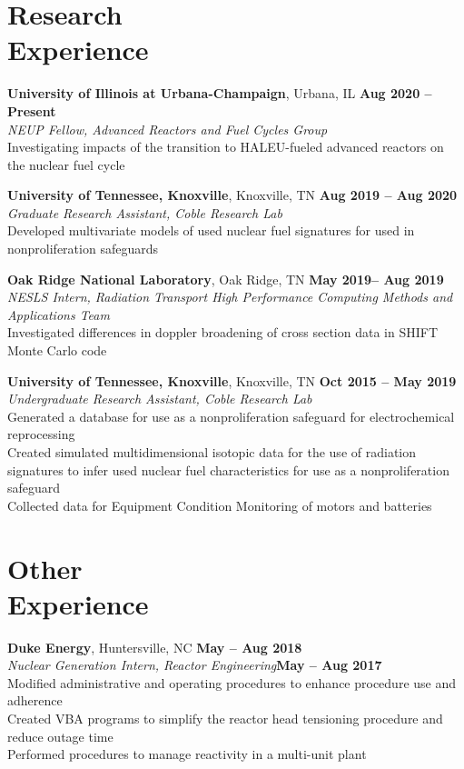 \documentclass[margin,line]{resume}
\begin{document}
\begin{resume}
    \section{\mysidestyle Research\\Experience}
    \textbf{University of Illinois at Urbana-Champaign}, Urbana, IL \hfill \textbf{Aug 2020 -- Present} \\
                \textsl{NEUP Fellow, Advanced Reactors and Fuel Cycles Group} \\
                Investigating impacts of the transition to HALEU-fueled advanced 
                reactors on the nuclear fuel cycle

    \textbf{University of Tennessee, Knoxville}, Knoxville, TN \hfill \textbf{Aug 2019 -- Aug 2020}\\
                \textsl{Graduate Research Assistant, Coble Research Lab} \\ 
                Developed multivariate models of used nuclear fuel signatures for 
                used in nonproliferation safeguards

    \textbf{Oak Ridge National Laboratory}, Oak Ridge, TN \hfill \textbf{May 2019-- Aug 2019}\\
                \textsl{NESLS Intern, Radiation Transport High Performance Computing Methods and Applications Team}\\
                Investigated differences in doppler broadening of cross section data in SHIFT Monte Carlo code

    \textbf{University of Tennessee, Knoxville}, Knoxville, TN \hfill \textbf{Oct 2015 -- May 2019}\\
                \textsl{Undergraduate Research Assistant, Coble Research Lab}\\
                Generated a database for use as a nonproliferation safeguard for electrochemical reprocessing \\
                Created simulated multidimensional isotopic data for the use of radiation signatures to infer used nuclear fuel characteristics for use as a nonproliferation safeguard\\ 
                Collected data for Equipment Condition Monitoring of motors and batteries

    \section{\mysidestyle Other\\Experience}
    \textbf{Duke Energy}, Huntersville, NC \hfill \textbf{May -- Aug 2018}\\
                \textsl{Nuclear Generation Intern, Reactor Engineering}\hfill \textbf{May -- Aug 2017}\\
                Modified administrative and operating procedures to enhance procedure use and adherence \\
                Created VBA programs to simplify the reactor head tensioning procedure and reduce outage time \\
                Performed procedures to manage reactivity in a multi-unit plant 


\end{resume}
\end{document}
